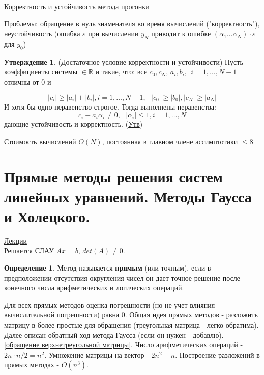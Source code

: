 \documentclass[specialist, subf, href, colorlinks=true, 12pt, times, mtpro, final]{disser}
\theoremstyle{definition}
\newtheorem{defn}{Определение}[section]
\newtheorem{state}{Утверждение}[section]
\begin{document}
    \begin{center}
    Корректность и устойчивость метода прогонки 
    \end{center} 

    Проблемы: обращение в нуль знаменателя во время вычислений ("корректность"), неустойчивость (ошибка $\varepsilon$ при вычислении $y_N$ приводит к ошибке $(\alpha_1 \dots \alpha_N)\cdot \varepsilon$ для $y_0$) 

    \begin{state}
        (Достаточное условие корректности и устойчивости) Пусть коэффициенты системы $\in \mathbb{R}$ и такие, что: все $c_0, c_N$, $a_i, b_i, \ \ i = 1, \dots, N-1$ отличны от 0 и 
    
        $$|c_i| \ge |a_i|+|b_i|, i = 1, \dots, N-1, \ \ \ |c_0| \ge |b_0|, |c_N| \ge |a_N|$$
        И хотя бы одно неравенство строгое. Тогда выполнены неравенства:
        $$c_i - a_i\alpha_i \ne 0, \ \ \ |\alpha_i| \le 1, i = 1, \dots, N$$
        дающие устойчивость и корректность.
        (\hyperlink {lects.50}{Утв})
    \end{state}
    
    Стоимость вычислений $O(N)$, постоянная в главном члене ассимптотики $\le 8$

\section {Прямые методы решения систем линейных уравнений. Методы Гаусса и Холецкого.}
    \hyperlink {lects.51}{Лекции}\\
    Решается СЛАУ $Ax = b$, $det(A) \ne 0$.
    \begin{defn}
    Метод называется \textbf{прямым} (или точным), если в предположении отсутствия округления чисел он дает точное решение после конечного числа арифметических и логических операций.
    \end{defn}
    
    Для всех прямых методов оценка погрешности (но не учет влияния вычислительной погрешности) равна 0. Общая идея прямых методов - разложить матрицу в более простые для обращения (треугольная матрица        - легко обратима). Далее описан обратный ход метода Гаусса (если он нужен - добавлю). \hyperlink {lects.51}{[обращение верхнетреугольной матрицы]}. Число арифметических операций - $2n \cdot n/2 =         n^2$. Умножение матрицы на вектор - $2n^2 - n$. Построение разложений в прямых методах - $O(n^3)$. 
    
\end{document}
